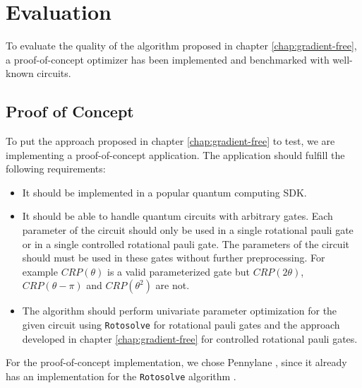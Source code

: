 \chapter{Evaluation}
\label{chap:evaluation}

To evaluate the quality of the algorithm proposed in chapter
\ref{chap:gradient-free}, a proof-of-concept optimizer has been implemented
and benchmarked with well-known circuits.

\section{Proof of Concept}
To put the approach proposed in chapter \ref{chap:gradient-free} to test,
we are implementing a proof-of-concept application.
The application should fulfill the following requirements:

\begin{itemize}
    \item
        It should be implemented in a popular quantum computing SDK.
    \item
        It should be able to handle quantum circuits with arbitrary gates.
        Each parameter of the circuit should only be used in a single rotational
        pauli gate or in a single controlled rotational pauli gate.
        The parameters of the circuit should must be used in these gates without
        further preprocessing.
        For example $CRP(\theta)$ is a valid parameterized gate but
        $CRP(2\theta)$, $CRP(\theta - \pi)$ and $CRP(\theta^2)$ are not.
    \item
        The algorithm should perform univariate parameter optimization for the
        given circuit using \texttt{Rotosolve} \cite{ostaszewski_structure_2021}
        for rotational pauli gates and the approach developed in
        chapter \ref{chap:gradient-free} for controlled rotational pauli gates.
\end{itemize}

For the proof-of-concept implementation, we chose Pennylane
\cite{bergholm_pennylane_2022}, since it already has an implementation for the
\texttt{Rotosolve} algorithm \cite{ostaszewski_structure_2021}.


